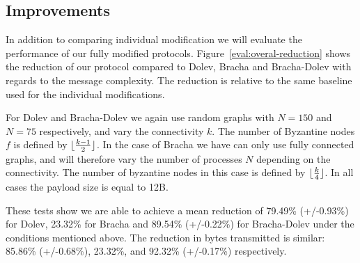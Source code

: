 
\subsection{Improvements}
In addition to comparing individual modification we will evaluate the performance of our fully modified protocols. Figure~\ref{eval:overal-reduction} shows the reduction of our protocol compared to Dolev, Bracha and Bracha-Dolev with regards to the message complexity. The reduction is relative to the same baseline used for the individual modifications.

For Dolev and Bracha-Dolev we again use random graphs with $N=150$ and $N=75$ respectively, and vary the connectivity $k$. The number of Byzantine nodes $f$ is defined by $\lfloor\frac{k-1}{2}\rfloor$. In the case of Bracha we have can only use fully connected graphs, and will therefore vary the number of processes $N$ depending on the connectivity. The number of byzantine nodes in this case is defined by $\lfloor\frac{k}{4}\rfloor$. In all cases the payload size is equal to 12B. 

These tests show we are able to achieve a mean reduction of 79.49\% (+/-0.93\%) for Dolev, 23.32\% for Bracha and 89.54\% (+/-0.22\%) for Bracha-Dolev under the conditions mentioned above. The reduction in bytes transmitted is similar: 85.86\% (+/-0.68\%), 23.32\%, and 92.32\% (+/-0.17\%) respectively. 

